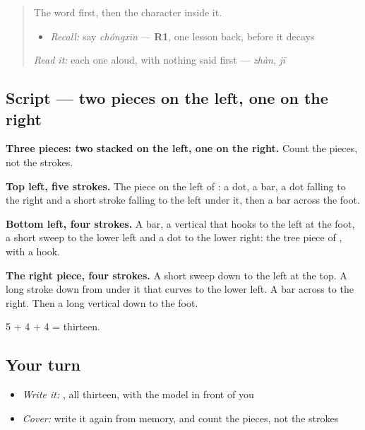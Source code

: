 \begin{quote}
The word first, then the character inside it.

\begin{itemize}
\raggedright
  \item \emph{Recall:} say \emph{chóngxīn} — \textbf{R1}, one lesson back, before it decays
\end{itemize}

\begin{quote}
 
\end{quote}

\emph{Read it:} each one aloud, with nothing said first — \emph{zhàn}, \emph{jī}
\end{quote}

\subsection*{Script — two pieces on the left, one on the right}

\begin{quote}
\end{quote}

\textbf{Three pieces: two stacked on the left, one on the right.} Count the pieces, not the strokes.

\textbf{Top left, five strokes.} The piece on the left of : a dot, a bar, a dot falling to the right and a short stroke falling to the left under it, then a bar across the foot.

\textbf{Bottom left, four strokes.} A bar, a vertical that hooks to the left at the foot, a short sweep to the lower left and a dot to the lower right: the tree piece of , with a hook.

\textbf{The right piece, four strokes.} A short sweep down to the left at the top. A long stroke down from under it that curves to the lower left. A bar across to the right. Then a long vertical down to the foot.

5 + 4 + 4 = thirteen.

\subsection*{Your turn}
\begin{itemize}
\raggedright
  \item \emph{Write it:} , all thirteen, with the model in front of you
  \item \emph{Cover:} write it again from memory, and count the pieces, not the strokes
\end{itemize}

